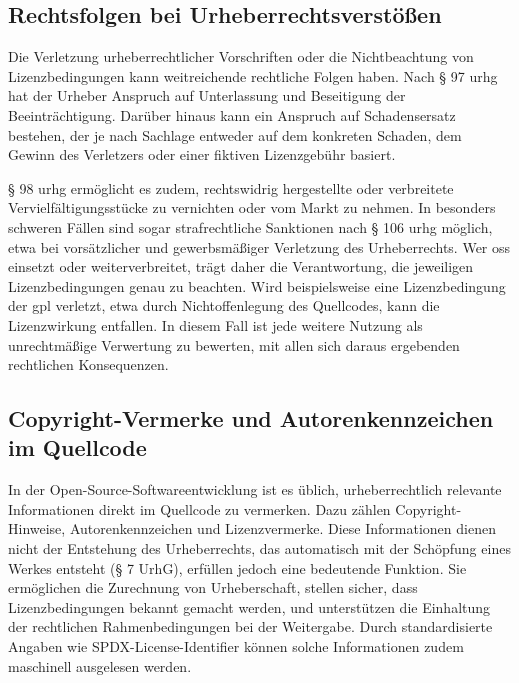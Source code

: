 \subsection{Rechtsfolgen bei Urheberrechtsverstößen}\label{subsec:rechtsfolgen-bei-urheberrechtsverstoen}

Die Verletzung urheberrechtlicher Vorschriften oder die Nichtbeachtung von Lizenzbedingungen kann weitreichende rechtliche Folgen haben.
Nach § 97 \gls{urhg} hat der Urheber Anspruch auf Unterlassung und Beseitigung der Beeinträchtigung.
Darüber hinaus kann ein Anspruch auf Schadensersatz bestehen, der je nach Sachlage entweder auf dem konkreten Schaden, dem Gewinn des Verletzers oder einer fiktiven Lizenzgebühr basiert.

§ 98 \gls{urhg} ermöglicht es zudem, rechtswidrig hergestellte oder verbreitete Vervielfältigungsstücke zu vernichten oder vom Markt zu nehmen.
In besonders schweren Fällen sind sogar strafrechtliche Sanktionen nach § 106 \gls{urhg} möglich, etwa bei vorsätzlicher und gewerbsmäßiger Verletzung des Urheberrechts.
Wer \gls{oss} einsetzt oder weiterverbreitet, trägt daher die Verantwortung, die jeweiligen Lizenzbedingungen genau zu beachten.
Wird beispielsweise eine Lizenzbedingung der \gls{gpl} verletzt, etwa durch Nichtoffenlegung des Quellcodes, kann die Lizenzwirkung entfallen.
In diesem Fall ist jede weitere Nutzung als unrechtmäßige Verwertung zu bewerten, mit allen sich daraus ergebenden rechtlichen Konsequenzen.


\subsection{Copyright-Vermerke und Autorenkennzeichen im Quellcode}

In der Open-Source-Softwareentwicklung ist es üblich, urheberrechtlich relevante Informationen direkt im Quellcode zu vermerken.
Dazu zählen Copyright-Hinweise, Autorenkennzeichen und Lizenzvermerke.
Diese Informationen dienen nicht der Entstehung des Urheberrechts, das automatisch mit der Schöpfung eines Werkes entsteht (§ 7 UrhG), erfüllen jedoch eine bedeutende Funktion.
Sie ermöglichen die Zurechnung von Urheberschaft, stellen sicher, dass Lizenzbedingungen bekannt gemacht werden, und unterstützen die Einhaltung der rechtlichen Rahmenbedingungen bei der Weitergabe.
Durch standardisierte Angaben wie SPDX-License-Identifier können solche Informationen zudem maschinell ausgelesen werden.

